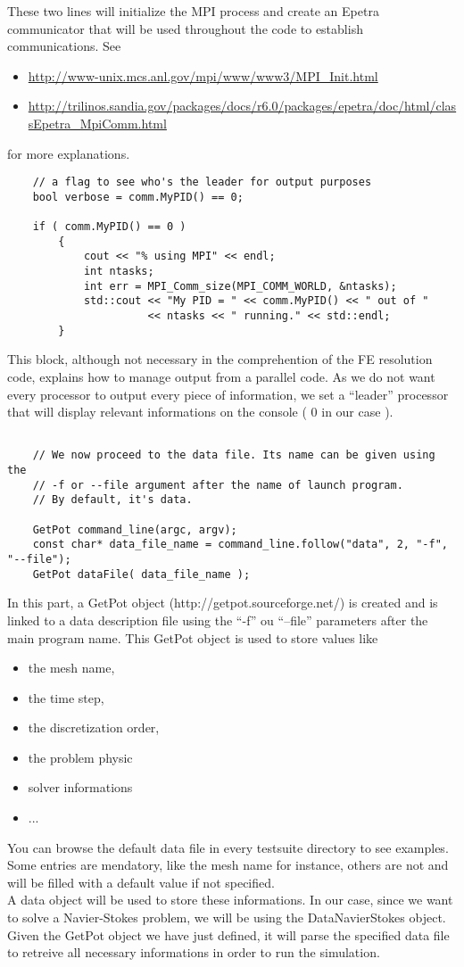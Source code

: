 These two lines will initialize the MPI process and create an Epetra communicator
that will be used throughout the code to establish communications. See
\begin{itemize}
\item \url{http://www-unix.mcs.anl.gov/mpi/www/www3/MPI\_Init.html}
\item \url{http://trilinos.sandia.gov/packages/docs/r6.0/packages/epetra/doc/html/classEpetra\_MpiComm.html}
\end{itemize}
for more explanations.

\begin{verbatim}
    // a flag to see who's the leader for output purposes
    bool verbose = comm.MyPID() == 0;

    if ( comm.MyPID() == 0 )
        {
            cout << "% using MPI" << endl;
            int ntasks;
            int err = MPI_Comm_size(MPI_COMM_WORLD, &ntasks);
            std::cout << "My PID = " << comm.MyPID() << " out of "
                      << ntasks << " running." << std::endl;
        }
\end{verbatim}
This block, although not necessary in the comprehention of the FE resolution code, explains
how to manage output from a parallel code. As we do not want every processor to output
every piece of information, we set a ``leader'' processor that will display relevant
informations on the console ( 0 in our case ).
\begin{verbatim}

    // We now proceed to the data file. Its name can be given using the
    // -f or --file argument after the name of launch program.
    // By default, it's data.

    GetPot command_line(argc, argv);
    const char* data_file_name = command_line.follow("data", 2, "-f", "--file");
    GetPot dataFile( data_file_name );

\end{verbatim}

\noident In this part, a GetPot object (http://getpot.sourceforge.net/) is created
and is linked to a data description file using  the ``-f'' ou ``--file'' parameters after
the main program name. This GetPot object is used to store values like
\begin{itemize}
\item the mesh name,
\item the time step,
\item the discretization order,
\item the problem physic
\item solver informations
\item ...
\end{itemize}
You can browse the default data file in every testsuite directory to see examples.
Some entries are mendatory, like the mesh name for instance, others are not and will be
filled with a default value if not specified.\\
A data object will be used to store these informations. In our case, since we want to
solve a Navier-Stokes problem, we will be using the DataNavierStokes object.
Given the GetPot object we have just defined, it will parse the specified data file
to retreive all necessary informations in order to run the simulation.


